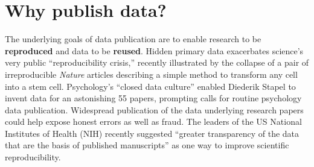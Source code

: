 \documentclass[10pt,a4paper,twocolumn]{article}
\begin{document}
\section*{Why publish data?}\label{why-publish-data}

The underlying goals of data publication are to enable research to be \textbf{reproduced} and data to be \textbf{reused}.
Hidden primary data exacerbates science's very public ``reproducibility crisis,''\cite{mobley_survey_2013,pashler_is_2012,zimmer_rise_2012,hiltzik_science_2013,begley_drug_2012} recently illustrated by the collapse of a pair of irreproducible \textit{Nature} articles describing a simple method to transform any cell into a stem cell\cite{cyranoski_acid-bath_2014, tabuchi_one_2014}.
Psychology's ``closed data culture''\cite{doorn_lies_2013} enabled Diederik Stapel to invent data for an astonishing 55 papers, prompting calls for routine psychology data publication\cite{levelt_committee_flawed_2012,wicherts_psychology_2011,doorn_lies_2013}. 
Widespread publication of the data underlying research papers could help expose honest errors as well as fraud\cite{drew_lost_2013}.
The leaders of the US National Institutes of Health (NIH) recently suggested ``greater transparency of the data that are the basis of published manuscripts'' as one way to improve scientific reproducibility\cite{collins_nih_2014}.
\end{document}
